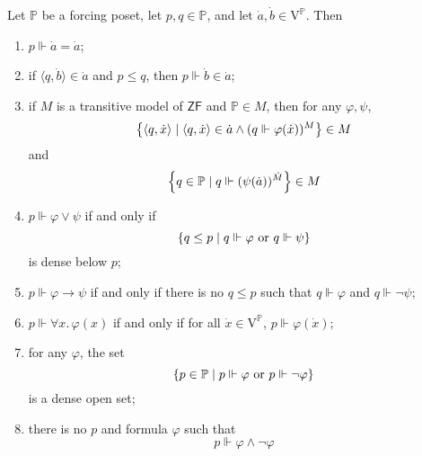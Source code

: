\begin{proposition}
    Let \( \mathbb P \) be a forcing poset, let \( p, q \in \mathbb P \), and let \( \dot a, \dot b \in \mathrm{V}^{\mathbb P} \).
    Then
    \begin{enumerate}
        \item \( p \Vdash \dot a = \dot a \);
        \item if \( \langle q, \dot b \rangle \in \dot a \) and \( p \leq q \), then \( p \Vdash \dot b \in \dot a \);
        \item if \( M \) is a transitive model of \( \mathsf{ZF} \) and \( \mathbb P \in M \), then for any \( \varphi, \psi \),
        \[ \qty{\langle q, \dot x \rangle \mid \langle q, \dot x \rangle \in \dot a \wedge (q \Vdash \varphi(\dot x))^M} \in M \]
        and
        \[ \qty{q \in \mathbb P \mid q \Vdash (\psi(\dot a))^{\check M}} \in M \]
        \item \( p \Vdash \varphi \vee \psi \) if and only if
        \[ \qty{q \leq p \mid q \Vdash \varphi \text{ or } q \Vdash \psi} \]
        is dense below \( p \);
        \item \( p \Vdash \varphi \to \psi \) if and only if there is no \( q \leq p \) such that \( q \Vdash \varphi \) and \( q \Vdash \neg \psi \);
        \item \( p \Vdash \forall x.\, \varphi(x) \) if and only if for all \( \dot x \in \mathrm{V}^{\mathbb P} \), \( p \Vdash \varphi(\dot x) \);
        \item for any \( \varphi \), the set
        \[ \qty{p \in \mathbb P \mid p \Vdash \varphi \text{ or } p \Vdash \neg\varphi} \]
        is a dense open set;
        \item there is no \( p \) and formula \( \varphi \) such that
        \[ p \Vdash \varphi \wedge \neg\varphi \]
    \end{enumerate}
\end{proposition}

